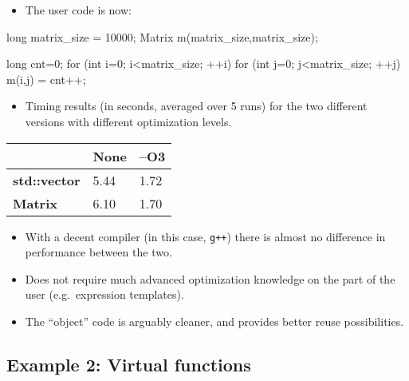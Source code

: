\begin{frame}[fragile]%
  \begin{itemize}
  \item {The user code is now:}
  \end{itemize}
\small
\begin{semiverbatim}
long matrix_size = 10000;
Matrix m(matrix_size,matrix_size);

long cnt=0;
for (int i=0; i<matrix_size; ++i)
  for (int j=0; j<matrix_size; ++j)
    m(i,j) = cnt++;
\end{semiverbatim}
\end{frame}


\begin{frame}
  \begin{itemize}
  \item Timing results (in seconds, averaged over 5 runs) for the two different versions
    with different optimization levels.
  \end{itemize}
  \begin{center}
  \begin{tabular}{lll} \toprule
                     & \textbf{None} & \textbf{--O3} \\ \midrule
    \textbf{std::vector}  & 5.44 & 1.72  \\ 
    \textbf{Matrix}       & 6.10 & 1.70  \\ \bottomrule
  \end{tabular}
  \end{center}
\end{frame}



\begin{frame}
  \begin{itemize}
    \itemsep=1cm
  \item {With a decent compiler (in this case, \texttt{g++}) there is
      almost no difference in performance between the two.}
  \item{Does not require much advanced optimization knowledge on
      the part of the user (e.g.\ expression templates).}
  \item{The ``object'' code is arguably cleaner, and provides better
    reuse possibilities.}
  \end{itemize}
\end{frame}



\subsection*{Example 2: Virtual functions}

